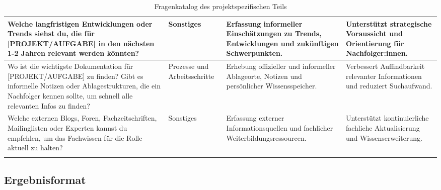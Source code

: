 \documentclass[
  10pt,
  ngerman,
  a4paper,
  toc=graduated,
  numbers=noenddot,
  headings=standardclasses,
  nonumberlist
]{scrartcl}
\begin{document}
\begin{longtable}{|L{4.9cm}|L{3.1cm}|L{3.8cm}|L{3.3cm}|}
Welche langfristigen Entwicklungen oder Trends siehst du, die für [PROJEKT/AUFGABE] in den nächsten 1-2 Jahren relevant werden könnten?
& Sonstiges
& Erfassung informeller Einschätzungen zu Trends, Entwicklungen und zukünftigen Schwerpunkten.
& Unterstützt strategische Voraussicht und Orientierung für Nachfolger:innen. \\
\hline

Wo ist die wichtigste Dokumentation für [PROJEKT/AUFGABE] zu finden? Gibt es informelle Notizen oder Ablagestrukturen, die ein Nachfolger kennen sollte, um schnell alle relevanten Infos zu finden?
& Prozesse und Arbeitsschritte
& Erhebung offizieller und informeller Ablageorte, Notizen und persönlicher Wissensspeicher.
& Verbessert Auffindbarkeit relevanter Informationen und reduziert Suchaufwand. \\
\hline

Welche externen Blogs, Foren, Fachzeitschriften, Mailinglisten oder Experten kannst du empfehlen, um das Fachwissen für die Rolle aktuell zu halten?
& Sonstiges
& Erfassung externer Informationsquellen und fachlicher Weiterbildungsressourcen.
& Unterstützt kontinuierliche fachliche Aktualisierung und Wissenserweiterung. \\
\hline
\caption{Fragenkatalog des projektspezifischen Teils}
\label{tab:fragenkatalog_teil_2}
\end{longtable}

\clearpage
\subsection{Ergebnisformat}
\label{anhang_ergebnisformat}
\end{document}

